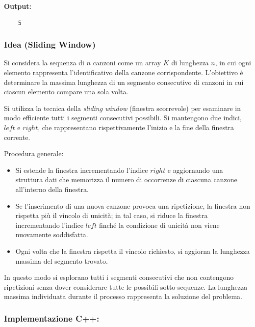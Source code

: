 \smallskip  
\noindent \textbf{Output:}  
\begin{verbatim}
	5
\end{verbatim}


\subsubsection*{Idea (Sliding Window)}

Si considera la sequenza di $n$ canzoni come un array $K$ di lunghezza $n$, in cui ogni elemento rappresenta l'identificativo della canzone corrispondente.  
L'obiettivo è determinare la massima lunghezza di un segmento consecutivo di canzoni in cui ciascun elemento compare una sola volta.

Si utilizza la tecnica della \emph{sliding window} (finestra scorrevole) per esaminare in modo efficiente tutti i segmenti consecutivi possibili.  
Si mantengono due indici, $left$ e $right$, che rappresentano rispettivamente l'inizio e la fine della finestra corrente.

\medskip
\noindent Procedura generale:
\begin{itemize}
	\item Si estende la finestra incrementando l'indice $right$ e aggiornando una struttura dati che memorizza il numero di occorrenze di ciascuna canzone all'interno della finestra.
	\item Se l'inserimento di una nuova canzone provoca una ripetizione, la finestra non rispetta più il vincolo di unicità; in tal caso, si riduce la finestra incrementando l'indice $left$ finché la condizione di unicità non viene nuovamente soddisfatta.
	\item Ogni volta che la finestra rispetta il vincolo richiesto, si aggiorna la lunghezza massima del segmento trovato.
\end{itemize}

\medskip
In questo modo si esplorano tutti i segmenti consecutivi che non contengono ripetizioni senza dover considerare tutte le possibili sotto-sequenze.  
La lunghezza massima individuata durante il processo rappresenta la soluzione del problema.


\subsubsection*{Implementazione C++:}

